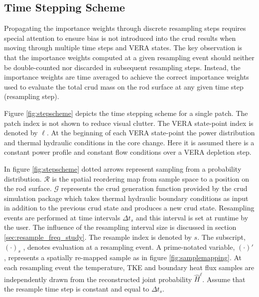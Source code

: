\subsection{Time Stepping Scheme}
\label{sec:time_step_scheme}

Propagating the importance weights through discrete resampling steps requires special attention to ensure bias is not introduced into the crud results when moving through multiple time steps and VERA states.  The key observation is that the importance weights computed at a given resampling event should neither be double-counted nor discarded in subsequent resampling steps.  Instead, the importance weights are time averaged to achieve the correct importance weights used to evaluate the total crud mass on the rod surface at any given time step (resampling step).

Figure \ref{fig:stepscheme} depicts the time stepping scheme for a single patch. The patch index is not shown to reduce visual clutter. The VERA state-point index is denoted by $\ell$.  At the beginning of each VERA state-point the power distribution and thermal hydraulic conditions in the core change.  Here it is assumed there is a constant power profile and constant flow conditions over a VERA depletion step.

In figure \ref{fig:stepscheme} dotted arrows represent sampling from a probability distribution.  $\mathcal R$ is the spatial reordering map from sample space to a position on the rod surface. $\mathcal G$ represents the crud generation function provided by the crud simulation package which takes thermal hydraulic boundary conditions as input in addition to the previous crud state and produces a new crud state.  Resampling events are performed at time intervals $\Delta t_s$ and this interval is set at runtime by the user.  The influence of the resampling interval size is discussed in section \ref{sec:resample_freq_study}.  The resample index is denoted by $s$.  The subscript, $(\cdot)_s$ , denotes evaluation at a resampling event.  A prime-notated variable,  $(\cdot)'$, represents a spatially re-mapped sample as in figure \ref{fig:samplemapping}.  At each resampling event the temperature, TKE and boundary heat flux samples are independently drawn from the reconstructed joint probability $\hat H^\ell$.  Assume that the resample time step is constant and equal to $\Delta t_s$.

